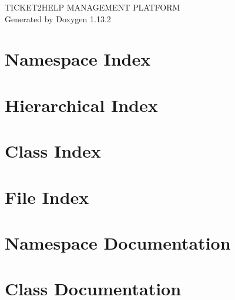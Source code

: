 \documentclass[twoside]{book}
\newcommand{\+}{\discretionary{\mbox{\scriptsize$\hookleftarrow$}}{}{}}
\newcommand{\clearemptydoublepage}{%
    \newpage{\pagestyle{empty}\cleardoublepage}%
  }
\begin{document}
  \raggedbottom
    \hypersetup{pageanchor=false,
                bookmarksnumbered=true,
                pdfencoding=unicode
               }
  \begin{titlepage}
  \vspace*{7cm}
  \begin{center}%
  {\Large TICKET2\+HELP MANAGEMENT PLATFORM}\\
  \vspace*{1cm}
  {\large Generated by Doxygen 1.13.2}\\
  \end{center}
  \end{titlepage}
  \clearemptydoublepage
  \tableofcontents
  \clearemptydoublepage
  \hypersetup{pageanchor=true}
\chapter{Namespace Index}

\chapter{Hierarchical Index}

\chapter{Class Index}

\chapter{File Index}

\chapter{Namespace Documentation}





\chapter{Class Documentation}

















\end{document}
